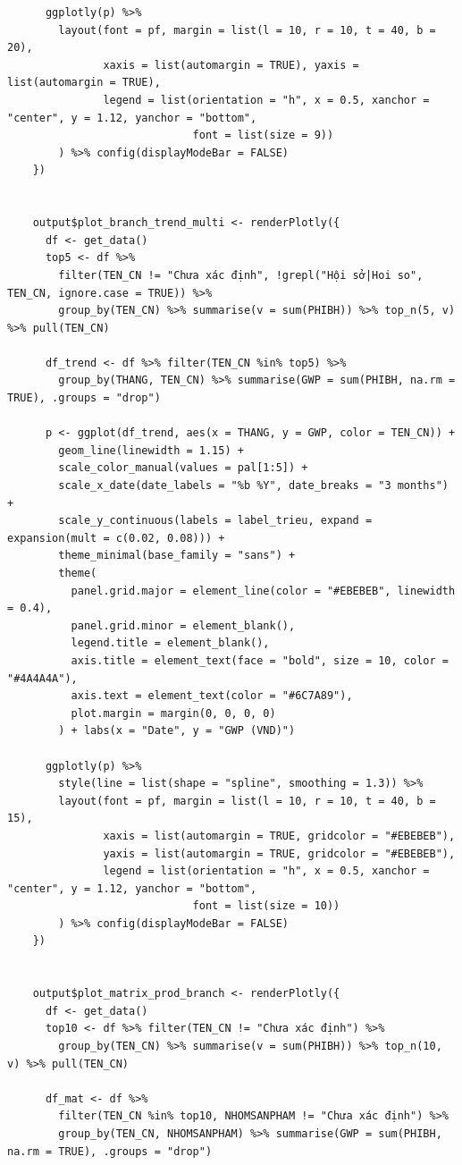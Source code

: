 \documentclass[12pt, a4paper]{article}
\begin{document}
\begin{lstlisting}
      ggplotly(p) %>%
        layout(font = pf, margin = list(l = 10, r = 10, t = 40, b = 20),
               xaxis = list(automargin = TRUE), yaxis = list(automargin = TRUE),
               legend = list(orientation = "h", x = 0.5, xanchor = "center", y = 1.12, yanchor = "bottom",
                             font = list(size = 9))
        ) %>% config(displayModeBar = FALSE)
    })


    output$plot_branch_trend_multi <- renderPlotly({
      df <- get_data()
      top5 <- df %>%
        filter(TEN_CN != "Chưa xác định", !grepl("Hội sở|Hoi so", TEN_CN, ignore.case = TRUE)) %>%
        group_by(TEN_CN) %>% summarise(v = sum(PHIBH)) %>% top_n(5, v) %>% pull(TEN_CN)

      df_trend <- df %>% filter(TEN_CN %in% top5) %>%
        group_by(THANG, TEN_CN) %>% summarise(GWP = sum(PHIBH, na.rm = TRUE), .groups = "drop")

      p <- ggplot(df_trend, aes(x = THANG, y = GWP, color = TEN_CN)) +
        geom_line(linewidth = 1.15) +
        scale_color_manual(values = pal[1:5]) +
        scale_x_date(date_labels = "%b %Y", date_breaks = "3 months") +
        scale_y_continuous(labels = label_trieu, expand = expansion(mult = c(0.02, 0.08))) +
        theme_minimal(base_family = "sans") +
        theme(
          panel.grid.major = element_line(color = "#EBEBEB", linewidth = 0.4),
          panel.grid.minor = element_blank(),
          legend.title = element_blank(),
          axis.title = element_text(face = "bold", size = 10, color = "#4A4A4A"),
          axis.text = element_text(color = "#6C7A89"),
          plot.margin = margin(0, 0, 0, 0)
        ) + labs(x = "Date", y = "GWP (VND)")

      ggplotly(p) %>%
        style(line = list(shape = "spline", smoothing = 1.3)) %>%
        layout(font = pf, margin = list(l = 10, r = 10, t = 40, b = 15),
               xaxis = list(automargin = TRUE, gridcolor = "#EBEBEB"),
               yaxis = list(automargin = TRUE, gridcolor = "#EBEBEB"),
               legend = list(orientation = "h", x = 0.5, xanchor = "center", y = 1.12, yanchor = "bottom",
                             font = list(size = 10))
        ) %>% config(displayModeBar = FALSE)
    })


    output$plot_matrix_prod_branch <- renderPlotly({
      df <- get_data()
      top10 <- df %>% filter(TEN_CN != "Chưa xác định") %>%
        group_by(TEN_CN) %>% summarise(v = sum(PHIBH)) %>% top_n(10, v) %>% pull(TEN_CN)

      df_mat <- df %>%
        filter(TEN_CN %in% top10, NHOMSANPHAM != "Chưa xác định") %>%
        group_by(TEN_CN, NHOMSANPHAM) %>% summarise(GWP = sum(PHIBH, na.rm = TRUE), .groups = "drop")


\end{lstlisting}
\end{document}
